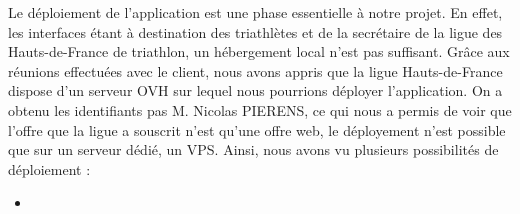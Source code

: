 Le déploiement de l'application est une phase essentielle à notre projet. En effet, les interfaces étant à destination des triathlètes et de la secrétaire de la ligue des Hauts-de-France de triathlon, un hébergement local n'est pas suffisant.\newline
Grâce aux réunions effectuées avec le client, nous avons appris que la ligue Hauts-de-France dispose d'un serveur OVH sur lequel nous pourrions déployer l'application. \newline
On a obtenu les identifiants pas M. Nicolas PIERENS, ce qui nous a permis de voir que l'offre que la ligue a souscrit n'est qu'une offre web, le déployement n'est possible que sur un serveur dédié, un VPS. Ainsi, nous avons vu plusieurs possibilités de déploiement : 
\begin{itemize}
	\item  
\end{itemize} 
